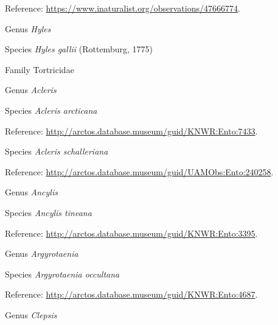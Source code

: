 \documentclass[9pt, article]{memoir}
\begin{document}
\begin{multicols}{2}
Reference: 
\url{https://www.inaturalist.org/observations/47666774}.

\vspace{6pt}\noindent\hspace{30pt}Genus \textit{Hyles}


\vspace{6pt}\noindent\hspace{36pt}Species \textit{Hyles gallii} (Rottemburg, 1775)


\vspace{6pt}\noindent\hspace{24pt}Family Tortricidae


\vspace{6pt}\noindent\hspace{30pt}Genus \textit{Acleris}


\vspace{6pt}\noindent\hspace{36pt}Species \textit{Acleris arcticana}


Reference: 
\url{http://arctos.database.museum/guid/KNWR:Ento:7433}.

\vspace{6pt}\noindent\hspace{36pt}Species \textit{Acleris schalleriana}


Reference: 
\url{http://arctos.database.museum/guid/UAMObs:Ento:240258}.

\vspace{6pt}\noindent\hspace{30pt}Genus \textit{Ancylis}


\vspace{6pt}\noindent\hspace{36pt}Species \textit{Ancylis tineana}


Reference: 
\url{http://arctos.database.museum/guid/KNWR:Ento:3395}.

\vspace{6pt}\noindent\hspace{30pt}Genus \textit{Argyrotaenia}


\vspace{6pt}\noindent\hspace{36pt}Species \textit{Argyrotaenia occultana}


Reference: 
\url{http://arctos.database.museum/guid/KNWR:Ento:4687}.

\vspace{6pt}\noindent\hspace{30pt}Genus \textit{Clepsis}



\end{multicols}
\end{document}
